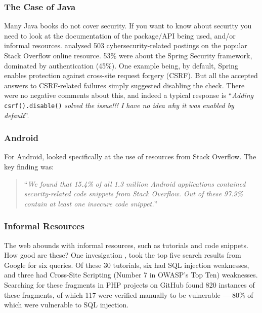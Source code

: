 \documentclass[a4paper,11pt]{article}
\begin{document}
\subsubsection*{The Case of Java}\label{sec:Java}

Many Java books do not cover security.  If you want to know about security you need to look at the documentation of the package/API being used, and/or  informal resources. \cite{Mengetal2018a} analysed 503 cybersecurity-related postings on the popular Stack Overflow online resource. 53\% were about the Spring Security framework, dominated by authentication (45\%).  One example being, by default, Spring enables protection against cross-site request forgery (CSRF). But all the accepted answers to CSRF-related failures simply suggested disabling the check. There were no negative comments about this, and indeed a typical response is ``{\emph{Adding}} \verb!csrf().disable()!
{\emph{{solved the issue!!! I have no idea why it was enabled by default}}''. }

\subsubsection*{Android}\label{sec:Android}

For Android, \cite{Fischeretal2017a} looked specifically at the use of resources from Stack Overflow. The key finding was:

\begin{quote}
``{\emph{We found that 15.4\% of all 1.3 million Android applications
contained security-related code snippets from
Stack Overflow. Out of these 97.9\% contain at least one
insecure code snippet.}}''
\end{quote}

\subsubsection*{Informal Resources}\label{sec:informal}

The web abounds with informal resources, such as tutorials and code snippets. How good are these? One invesigation \cite{Unruhetal2017a}, took the top five search results from Google for six queries. Of these 30 tutorials, six had SQL injection weaknesses, and three had Cross-Site Scripting (Number 7 in OWASP's Top Ten) weaknesses. Searching for these fragments in PHP projects on GitHub found 820 instances of these fragments, of which 117 were verified manually to be vulnerable --- 80\% of which were vulnerable to SQL injection. 
\end{document}
